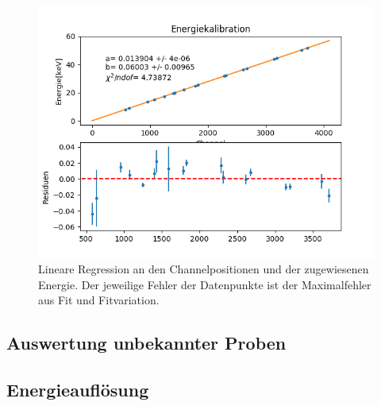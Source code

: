 \documentclass[12pt,a4paper]{article}
\begin{document}
\begin{figure}
\centering
\includegraphics[scale=0.8]{Bilder/alpha/kal.png}
\caption{Lineare Regression an den Channelpositionen und der zugewiesenen Energie. Der jeweilige Fehler der Datenpunkte ist der Maximalfehler aus Fit und Fitvariation.}
\label{fig:kal_linreg}
\end{figure}

\subsection{Auswertung unbekannter Proben}
\subsection{Energieauflösung}
\end{document}
